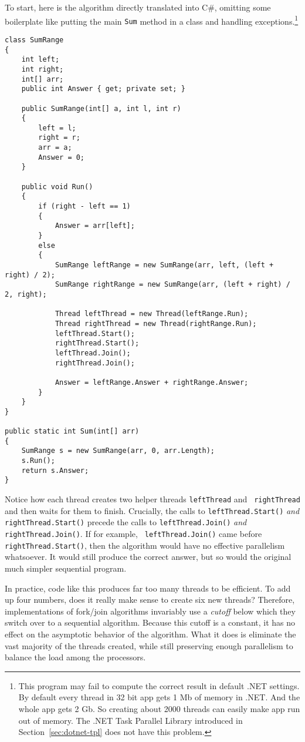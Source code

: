 \documentclass[10pt]{article}
\begin{document}
To start, here is the algorithm directly translated into C\#,
omitting some boilerplate like putting the main {\tt Sum} method in a
class and handling exceptions.\footnote{This program may fail to compute the 
 correct result in default .NET settings. By default every thread in 32 
 bit app gets 1 Mb of memory in .NET. And the whole app gets 2 Gb. So 
 creating about 2000 threads can easily make app run out of memory. 
 The .NET Task Parallel Library introduced in Section~\ref{sec:dotnet-tpl} 
 does not have this problem.}
\begin{verbatim}
class SumRange
{
    int left;
    int right;
    int[] arr;
    public int Answer { get; private set; }

    public SumRange(int[] a, int l, int r)
    {
        left = l;
        right = r;
        arr = a;
        Answer = 0;
    }

    public void Run()
    {
        if (right - left == 1)
        {
            Answer = arr[left];
        }
        else
        {
            SumRange leftRange = new SumRange(arr, left, (left + right) / 2);
            SumRange rightRange = new SumRange(arr, (left + right) / 2, right);

            Thread leftThread = new Thread(leftRange.Run);
            Thread rightThread = new Thread(rightRange.Run);
            leftThread.Start();
            rightThread.Start();
            leftThread.Join();
            rightThread.Join();

            Answer = leftRange.Answer + rightRange.Answer;
        }
    }
}

public static int Sum(int[] arr)
{
    SumRange s = new SumRange(arr, 0, arr.Length);
    s.Run();
    return s.Answer;
}
\end{verbatim}
Notice how each thread creates two helper threads {\tt leftThread} and {\tt
  rightThread} and then waits for them to finish.  Crucially, the calls to
  {\tt leftThread.Start()} \emph{and} {\tt rightThread.Start()} precede the calls to
  {\tt leftThread.Join()} \emph{and} {\tt rightThread.Join()}.  If for example, {\tt
  leftThread.Join()} came before {\tt rightThread.Start()}, then the algorithm
  would have no effective parallelism whatsoever.  It would still
  produce the correct answer, but so would the original much simpler
  sequential program.
  
  In practice, code like this produces far too many threads to be
  efficient.  To add up four numbers, does it really make sense to
  create six new threads?  Therefore, implementations of fork/join
  algorithms invariably use a \emph{cutoff} below which they switch
  over to a sequential algorithm.  Because this cutoff is a constant,
  it has no effect on the asymptotic behavior of the algorithm.  What
  it does is eliminate the vast majority of the threads created, while
  still preserving enough parallelism to balance the load among the
  processors.
\end{document}
